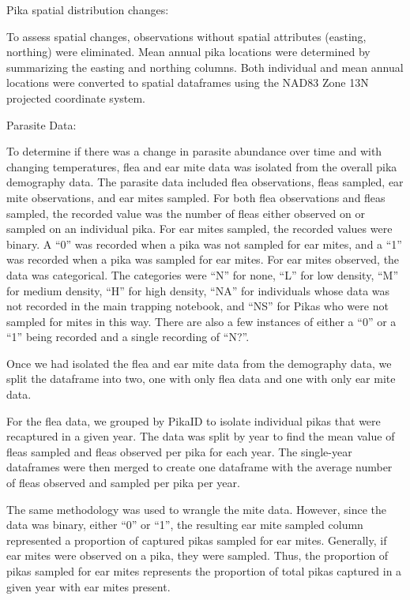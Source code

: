 \documentclass[
  12pt,
]{article}
\begin{document}
Pika spatial distribution changes:

To assess spatial changes, observations without spatial attributes
(easting, northing) were eliminated. Mean annual pika locations were
determined by summarizing the easting and northing columns. Both
individual and mean annual locations were converted to spatial
dataframes using the NAD83 Zone 13N projected coordinate system.

Parasite Data:

To determine if there was a change in parasite abundance over time and
with changing temperatures, flea and ear mite data was isolated from the
overall pika demography data. The parasite data included flea
observations, fleas sampled, ear mite observations, and ear mites
sampled. For both flea observations and fleas sampled, the recorded
value was the number of fleas either observed on or sampled on an
individual pika. For ear mites sampled, the recorded values were binary.
A ``0'' was recorded when a pika was not sampled for ear mites, and a
``1'' was recorded when a pika was sampled for ear mites. For ear mites
observed, the data was categorical. The categories were ``N'' for none,
``L'' for low density, ``M'' for medium density, ``H'' for high density,
``NA'' for individuals whose data was not recorded in the main trapping
notebook, and ``NS'' for Pikas who were not sampled for mites in this
way. There are also a few instances of either a ``0'' or a ``1'' being
recorded and a single recording of ``N?''.

Once we had isolated the flea and ear mite data from the demography
data, we split the dataframe into two, one with only flea data and one
with only ear mite data.

For the flea data, we grouped by PikaID to isolate individual pikas that
were recaptured in a given year. The data was split by year to find the
mean value of fleas sampled and fleas observed per pika for each year.
The single-year dataframes were then merged to create one dataframe with
the average number of fleas observed and sampled per pika per year.

The same methodology was used to wrangle the mite data. However, since
the data was binary, either ``0'' or ``1'', the resulting ear mite
sampled column represented a proportion of captured pikas sampled for
ear mites. Generally, if ear mites were observed on a pika, they were
sampled. Thus, the proportion of pikas sampled for ear mites represents
the proportion of total pikas captured in a given year with ear mites
present.
\end{document}
